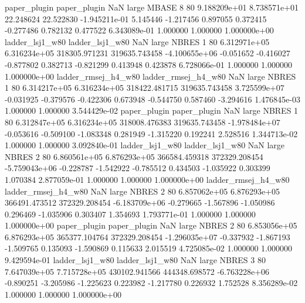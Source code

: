        paper_plugin        paper_plugin                   NaN      large    MBASE                 8 80 9.188209e+01   8.738571e+01     22.248624      22.522830 -1.945211e-01      5.145446     -1.217456     0.897055       0.372415 -0.277486   0.782132     0.477522   6.343089e-01            1.000000        1.000000        1.000000e+00
    ladder_lsj1_w80     ladder_lsj1_w80                   NaN      large    NBRES                 1 80 6.312971e+05   6.316234e+05 318305.971231  319635.743458 -4.100655e+06     -0.051652     -0.416027    -0.877802       0.382713 -0.821299   0.413948     0.423878   6.728066e-01            1.000000        1.000000        1.000000e+00
ladder_rmsej_h4_w80 ladder_rmsej_h4_w80                   NaN      large    NBRES                 1 80 6.314217e+05   6.316234e+05 318422.481715  319635.743458  3.725599e+07     -0.031925     -0.379576    -0.422306       0.673948 -0.544750   0.587460    -3.294616   1.476845e-03            1.000000        1.000000        3.544429e-02
       paper_plugin        paper_plugin                   NaN      large    NBRES                 1 80 6.312847e+05   6.316234e+05 318008.476383  319635.743458 -1.978484e+07     -0.053616     -0.509100    -1.083348       0.281949 -1.315220   0.192241     2.528516   1.344713e-02            1.000000        1.000000        3.092840e-01
    ladder_lsj1_w80     ladder_lsj1_w80                   NaN      large    NBRES                 2 80 6.860561e+05   6.876293e+05 366584.459318  372329.208454 -5.759043e+06     -0.228787     -1.542922    -0.785512       0.434503 -1.035922   0.303399     1.070384   2.877059e-01            1.000000        1.000000        1.000000e+00
ladder_rmsej_h4_w80 ladder_rmsej_h4_w80                   NaN      large    NBRES                 2 80 6.857062e+05   6.876293e+05 366491.473512  372329.208454 -6.183709e+06     -0.279665     -1.567896    -1.050986       0.296469 -1.035906   0.303407     1.354693   1.793771e-01            1.000000        1.000000        1.000000e+00
       paper_plugin        paper_plugin                   NaN      large    NBRES                 2 80 6.853056e+05   6.876293e+05 365377.104764  372329.208454 -1.296035e+07     -0.337932     -1.867193    -1.509765       0.135093 -1.590869   0.115633     2.015519   4.725085e-02            1.000000        1.000000        9.429594e-01
    ladder_lsj1_w80     ladder_lsj1_w80                   NaN      large    NBRES                 3 80 7.647039e+05   7.715728e+05 430102.941566  444348.698572 -6.763228e+06     -0.890251     -3.205986    -1.225623       0.223982 -1.217780   0.226932     1.752528   8.356289e-02            1.000000        1.000000        1.000000e+00
